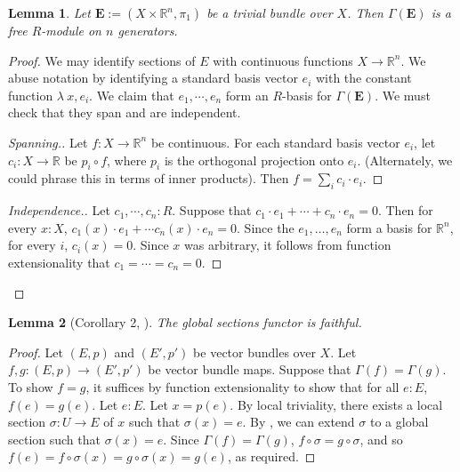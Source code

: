 \documentclass[11pt]{article}
\newcommand{\R}{\mathbb{R}}
\theoremstyle{plain}
\newtheorem{lemma}{Lemma}[section]
\theoremstyle{definition}
\begin{document}
\begin{lemma}\label{lemma:global-sections-trivial-fg}
  Let \(\mathbf{E} := (X \times \R^n, \pi_1)\) be a trivial bundle over \(X\). Then \(\Gamma(\mathbf{E})\) is a free \(R\)-module on \(n\) generators.
\end{lemma}

\begin{proof}
  We may identify sections of \(E\) with continuous functions \(X \to \mathbb{R}^n\). We abuse notation by identifying a standard basis vector \(e_i\) with the constant function \(\lambda\ x, e_i\). We claim that \(e_1, \cdots, e_n\) form an \(R\)-basis for \(\Gamma(\mathbf{E})\). We must check that they span and are independent.
  \begin{proof}[Spanning.]
    Let \(f : X \to \R^n\) be continuous. For each standard basis vector \(e_i\), let \(c_i : X \to \R\) be \(p_i \circ f\), where \(p_i\) is the orthogonal projection onto \(e_i\). (Alternately, we could phrase this in terms of inner products). Then \(f = \sum_i c_i \cdot e_i\).
  \end{proof}

  \begin{proof}[Independence.]
    Let \(c_1, \cdots, c_n : R\). Suppose that \(c_1 \cdot e_1 + \cdots + c_n \cdot e_n = 0\). Then for every \(x : X\), \(c_1(x) \cdot e_1 + \cdots c_n(x) \cdot e_n = 0\). Since the \(e_1, \dots, e_n\) form a basis for \(\R^n\), for every \(i\), \(c_i(x) = 0\). Since \(x\) was arbitrary, it follows from function extensionality that \(c_1 = \cdots = c_n = 0\).
  \end{proof}
\end{proof}

\begin{lemma}[Corollary 2, \cite{swan1962vector}]\label{lemma:global-sections-faithful}
  The global sections functor is faithful.
\end{lemma}

\begin{proof}
  Let \((E,p)\) and \((E',p')\) be vector bundles over \(X\). Let \(f,g : (E,p) \to (E',p')\) be vector bundle maps. Suppose that \(\Gamma(f) = \Gamma(g)\). To show \(f = g\), it suffices by function extensionality to show that for all \(e : E\), \(f(e) = g(e)\). Let \(e : E\). Let \(x = p(e)\). By local triviality, there exists a local section \(\sigma : U \to E\) of \(x\) such that \(\sigma(x) = e\). By , we can extend \(\sigma\) to a global section such that \(\sigma (x) = e\). Since \(\Gamma(f) = \Gamma(g)\), \(f \circ \sigma = g \circ \sigma\), and so \(f(e) = f \circ \sigma(x) = g \circ \sigma(x) = g(e)\), as required.
\end{proof}
\end{document}
